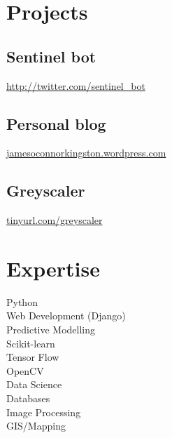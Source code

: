 \documentclass[]{deedy-resume-openfont}
\begin{document}
%
%

%
%



%
%

\begin{minipage}[t]{0.33\textwidth}


\section{Projects}\label{sec:projects}

\subsection{Sentinel bot}\label{subsec:sentinel-bot}
 \href{http://twitter.com/sentinel\_bot}{http://twitter.com/sentinel\_bot}
\subsection{Personal blog}\label{subsec:personal-blog}
\href{jamesoconnorkingston.wordpress.com}{jamesoconnorkingston.wordpress.com}
\subsection{Greyscaler}\label{subsec:greyscaler}
\href{tinyurl.com/greyscaler}{tinyurl.com/greyscaler}
\sectionsep



\section{Expertise}\label{sec:expertise}
Python \\
Web Development (Django) \\
Predictive Modelling \\
Scikit-learn \\
Tensor Flow \\
OpenCV \\
Data Science \\
Databases \\
Image Processing \\
GIS/Mapping \\
\sectionsep


\end{minipage}
\end{document}
